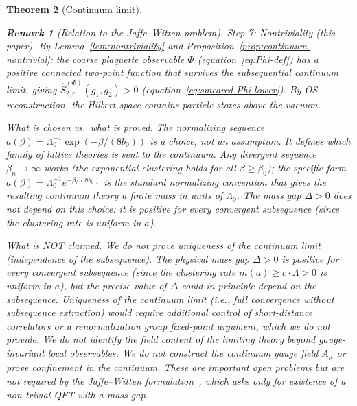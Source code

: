 \documentclass[11pt]{article}
\newtheorem{theorem}{Theorem}[section]
\theoremstyle{definition}
\newtheorem{remark}[theorem]{Remark}
\begin{document}
\begin{theorem}[Continuum limit]
\begin{remark}[Relation to the Jaffe--Witten problem]
\emph{Step 7: Nontriviality (this paper).}
By Lemma~\ref{lem:nontriviality} and
Proposition~\ref{prop:continuum-nontrivial}:
the coarse plaquette observable $\Phi$
(equation~\eqref{eq:Phi-def}) has a positive connected
two-point function that survives the subsequential
continuum limit, giving
$\hat S_{2,c}^{(\Phi)}(g_1,g_2)>0$
(equation~\eqref{eq:smeared-Phi-lower}).
By OS reconstruction, the Hilbert space contains
particle states above the vacuum.

\emph{What is chosen vs.\ what is proved.}
The normalizing sequence $a(\beta)=\Lambda_0^{-1}
\exp(-\beta/(8b_0))$ is a \emph{choice}, not an assumption.
It defines which family of lattice theories is sent to
the continuum.  \emph{Any} divergent sequence $\beta_n\to\infty$
works (the exponential clustering holds for all $\beta\ge\beta_0$);
the specific form $a(\beta)=\Lambda_0^{-1}e^{-\beta/(8b_0)}$
is the standard normalizing convention that gives the
resulting continuum theory a finite mass in units of $\Lambda_0$.
The mass gap $\Delta>0$ does not depend on this choice:
it is positive for \emph{every} convergent subsequence
(since the clustering rate is uniform in $a$).

\emph{What is NOT claimed.}
We do not prove uniqueness of the continuum limit
(independence of the subsequence).
The physical mass gap $\Delta>0$ is positive for
\emph{every} convergent subsequence (since the clustering
rate $m(a)\ge c\cdot\Lambda>0$ is uniform in $a$), but
the precise value of $\Delta$ could in principle depend
on the subsequence.  Uniqueness of the continuum limit
(i.e., full convergence without subsequence extraction)
would require additional control of short-distance
correlators or a renormalization group fixed-point
argument, which we do not provide.
We do not identify the field content of the limiting
theory beyond gauge-invariant local observables.
We do not construct the continuum gauge field $A_\mu$
or prove confinement in the continuum.
These are important open problems but are not required by
the Jaffe--Witten formulation~\cite{JaffeWitten}, which asks only for \emph{existence}
of a non-trivial QFT with a mass gap.


\end{remark}
\end{theorem}
\end{document}
